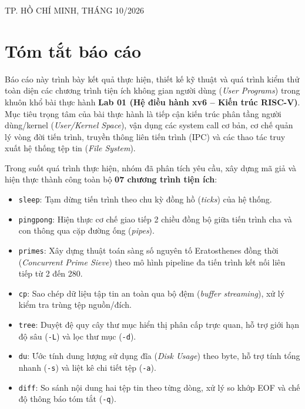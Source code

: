 \documentclass[12pt,a4paper]{article}
\begin{document}
\begin{titlepage}
\begin{tcolorbox}
\vfill

{\small\color{darkneutral} TP. HỒ CHÍ MINH, THÁNG 10/2026\par}

\end{tcolorbox}
\end{titlepage}

\newpage
{
  \hypersetup{linkcolor=darkneutral}
  \tableofcontents
}
\newpage

\section*{Tóm tắt báo cáo}

Báo cáo này trình bày kết quả thực hiện, thiết kế kỹ thuật và quá trình kiểm thử toàn diện các chương trình tiện ích không gian người dùng (\textit{User Programs}) trong khuôn khổ bài thực hành \textbf{Lab 01 (Hệ điều hành xv6 -- Kiến trúc RISC-V)}. Mục tiêu trọng tâm của bài thực hành là tiếp cận kiến trúc phân tầng người dùng/kernel (\textit{User/Kernel Space}), vận dụng các system call cơ bản, cơ chế quản lý vòng đời tiến trình, truyền thông liên tiến trình (IPC) và các thao tác truy xuất hệ thống tệp tin (\textit{File System}).

Trong suốt quá trình thực hiện, nhóm đã phân tích yêu cầu, xây dựng mã giả và hiện thực thành công toàn bộ \textbf{07 chương trình tiện ích}:
\begin{itemize}
    \item \texttt{sleep}: Tạm dừng tiến trình theo chu kỳ đồng hồ (\textit{ticks}) của hệ thống.
    \item \texttt{pingpong}: Hiện thực cơ chế giao tiếp 2 chiều đồng bộ giữa tiến trình cha và con thông qua cặp đường ống (\textit{pipes}).
    \item \texttt{primes}: Xây dựng thuật toán sàng số nguyên tố Eratosthenes đồng thời (\textit{Concurrent Prime Sieve}) theo mô hình pipeline đa tiến trình kết nối liên tiếp từ 2 đến 280.
    \item \texttt{cp}: Sao chép dữ liệu tập tin an toàn qua bộ đệm (\textit{buffer streaming}), xử lý kiểm tra trùng tệp nguồn/đích.
    \item \texttt{tree}: Duyệt đệ quy cây thư mục hiển thị phân cấp trực quan, hỗ trợ giới hạn độ sâu (\texttt{-L}) và lọc thư mục (\texttt{-d}).
    \item \texttt{du}: Ước tính dung lượng sử dụng đĩa (\textit{Disk Usage}) theo byte, hỗ trợ tính tổng nhanh (\texttt{-s}) và liệt kê chi tiết tệp (\texttt{-a}).
    \item \texttt{diff}: So sánh nội dung hai tệp tin theo từng dòng, xử lý so khớp EOF và chế độ thông báo tóm tắt (\texttt{-q}).
\end{itemize}
\end{document}
